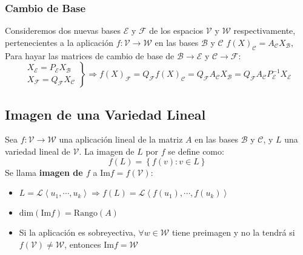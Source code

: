 \subsubsection{Cambio de Base}
Consideremos dos nuevas bases \(\mathcal{E}\) y \(\mathcal{F}\) de los espacios \(\mathcal{V}\) y \(\mathcal{W}\) respectivamente, pertenecientes a la aplicación \(f: \mathcal{V} \rightarrow \mathcal{W}\) en las bases \(\mathcal{B}\) y \(\mathcal{C}\) \(f(X)_\mathcal{C} = A_\mathcal{C} X_\mathcal{B}\), Para hayar las matrices de cambio de base de  \(\mathcal{B} \rightarrow \mathcal{E}\) y \(\mathcal{C} \rightarrow \mathcal{F}\):
\[
        \boxed{\left.\begin{matrix}
                X_\mathcal{E} = P_\mathcal{E} X_\mathcal{B}
                \\
                X_\mathcal{F} = Q_\mathcal{F} X_\mathcal{C}
        \end{matrix}\right\}
        \Rightarrow f(X)_\mathcal{F} = Q_\mathcal{F} f(X)_\mathcal{C} = Q_\mathcal{F} A_\mathcal{C} X_\mathcal{B} = Q_\mathcal{F}A_\mathcal{C}P^{-1}_\mathcal{E}X_\mathcal{E}}
\]
\subsection{Imagen de una Variedad Lineal}
Sea \(f : \mathcal{V} \rightarrow \mathcal{W}\) una aplicación lineal de la matriz \(A\) en las bases \(\mathcal{B}\) y \(\mathcal{C}\), y  \(L\) una variedad lineal de \(\mathcal{V}\). La imagen de \(L\) por \(f\) se define como:
\[
        f(L) = \left\{f(v): v \in L\right\}
\]
Se llama \textbf{imagen de \(f\)} a \(\text{Im}f = f (\mathcal{V})\):
\begin{itemize}
        \item \(L = \mathcal{L}\left\langle u_1, \cdots, u_k\right\rangle \Rightarrow f(L) = \mathcal{L}\left\langle f(u_1), \cdots, f(u_k)\right\rangle  \)
        \item \(\text{dim}\left(\text{Im}f\right) = \text{Rango}\left(A\right)  \)
        \item Si la aplicación es sobreyectiva, \(\forall w \in \mathcal{W}\) tiene preimagen y no la tendrá si \(f(\mathcal{V}) \neq \mathcal{W}\), entonces \(\text{Im}f = \mathcal{W}\)
\end{itemize}
